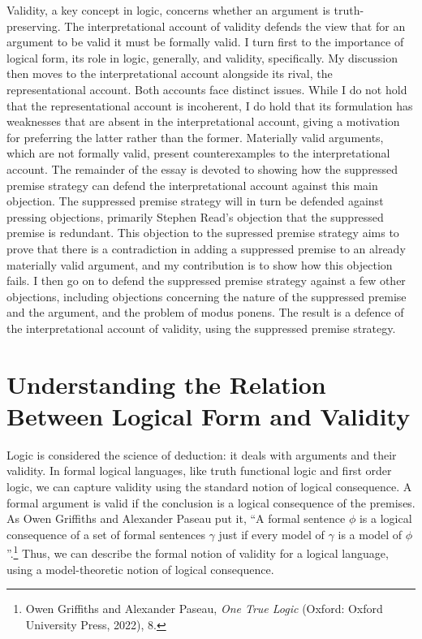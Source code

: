 Validity, a key concept in logic, concerns whether an argument is
truth-preserving. The interpretational account of validity defends the
view that for an argument to be valid it must be formally valid. I turn
first to the importance of logical form, its role in logic, generally,
and validity, specifically. My discussion then moves to the
interpretational account alongside its rival, the representational
account. Both accounts face distinct issues. While I do not hold that
the representational account is incoherent, I do hold that its
formulation has weaknesses that are absent in the interpretational
account, giving a motivation for preferring the latter rather than the
former. Materially valid arguments, which are not formally valid,
present counterexamples to the interpretational account. The remainder
of the essay is devoted to showing how the suppressed premise strategy
can defend the interpretational account against this main objection. The
suppressed premise strategy will in turn be defended against pressing
objections, primarily Stephen Read's objection that the suppressed
premise is redundant. This objection to the supressed premise strategy
aims to prove that there is a contradiction in adding a suppressed
premise to an already materially valid argument, and my contribution is
to show how this objection fails. I then go on to defend the suppressed
premise strategy against a few other objections, including objections
concerning the nature of the suppressed premise and the argument, and
the problem of modus ponens. The result is a defence of the
interpretational account of validity, using the suppressed premise
strategy.

\section*{Understanding the Relation Between Logical Form and Validity}

Logic is considered the science of deduction: it deals with arguments
and their validity. In formal logical languages, like truth functional
logic and first order logic, we can capture validity using the standard
notion of logical consequence. A formal argument is valid if the
conclusion is a logical consequence of the premises. As Owen Griffiths
and Alexander Paseau put it, ``A formal sentence $\phi$ is a logical
consequence of a set of formal sentences $\gamma$ just if every model of $\gamma$ is a
model of $\phi$''.\footnote{Owen Griffiths and Alexander Paseau, \emph{One
  True Logic} (Oxford: Oxford University Press, 2022), 8.} Thus, we can
describe the formal notion of validity for a logical language, using a
model-theoretic notion of logical consequence.

